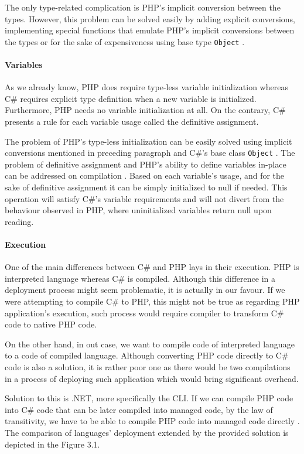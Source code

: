 The only type-related complication is PHP's implicit conversion between the types. However, this problem can be solved easily by adding explicit conversions, implementing special functions that emulate PHP's implicit conversions between the types or for the sake of expensiveness using base type \texttt{Object} \citep{Phalanger}.


\paragraph{Variables}
As we already know, PHP does require type-less variable initialization whereas C\# requires explicit type definition when a new variable is initialized. Furthermore, PHP needs no variable initialization at all. On the contrary, C\#  presents a rule for each variable usage called the definitive assignment.

The problem of PHP's type-less initialization can be easily solved using implicit conversions mentioned in preceding paragraph and C\#'s base class \texttt{Object} \citep{Phalanger}. The problem of definitive assignment and PHP's ability to define variables in-place can be addressed on compilation \citep{Peachpie}. Based on each variable's usage, and for the sake of definitive assignment it can be simply initialized to null if needed. This operation will satisfy C\#'s variable requirements and will not divert from the behaviour observed in PHP, where uninitialized variables return null upon reading.


\paragraph{Execution}
One of the main differences between C\# and PHP lays in their execution. PHP is interpreted language whereas C\# is compiled. Although this difference in a deployment process might seem problematic, it is actually in our favour. If we were attempting to compile C\# to PHP, this might not be true as regarding PHP application's execution, such process would require compiler to transform C\# code to native PHP code.

On the other hand, in out case, we want to compile code of interpreted language to a code of compiled language. Although converting PHP code directly to C\# code is also a solution, it is rather poor one as there would be two compilations in a process of deploying such application which would bring significant overhead.

Solution to this is .NET, more specifically the CLI. If we can compile PHP code into C\# code that can be later compiled into managed code, by the law of transitivity, we have to be able to compile PHP code into managed code directly \citep{Phalanger}. The comparison of languages' deployment extended by the provided solution is depicted in the Figure 3.1.

